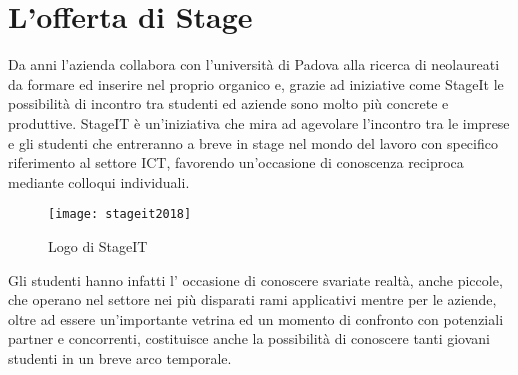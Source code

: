 \section{L'offerta di Stage}
Da anni l'azienda collabora con l'università di Padova alla ricerca di neolaureati da formare ed inserire nel proprio organico e, grazie ad iniziative come StageIt le possibilità di incontro tra studenti ed aziende sono molto più concrete e produttive.
StageIT è un'iniziativa che mira ad agevolare l'incontro tra le imprese e gli studenti che entreranno a breve in stage nel mondo del lavoro con specifico riferimento al settore ICT, favorendo un'occasione di conoscenza reciproca mediante colloqui individuali.
\begin{figure}[h]
\centering
\texttt{[image: stageit2018]}
\caption{Logo di StageIT}
\end{figure}
Gli studenti hanno infatti l' occasione di conoscere svariate realtà, anche piccole, che operano nel settore nei più disparati rami applicativi mentre per le aziende, oltre ad essere un'importante vetrina ed un momento di confronto con potenziali partner e concorrenti, costituisce anche la possibilità di conoscere tanti giovani studenti in un breve arco temporale.\\
